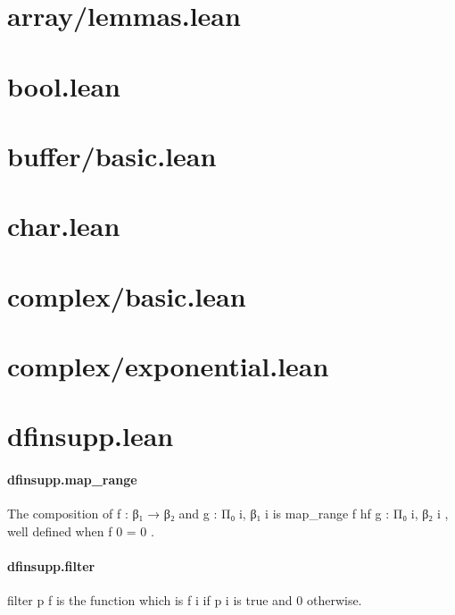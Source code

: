 \documentclass{article}
\begin{document}
\section{array/lemmas.lean}\section{bool.lean}\section{buffer/basic.lean}\section{char.lean}\section{complex/basic.lean}\section{complex/exponential.lean}\section{dfinsupp.lean}\paragraph{dfinsupp.map\_range}
\par
The composition of 
\colorbox[RGB]{253,246,227}{{{{\color[RGB]{101, 123, 131} f : β₁  }}}{{{\color[RGB]{133, 153, 0} → }}}{{{\color[RGB]{101, 123, 131}  β₂ }}}} and 
\colorbox[RGB]{253,246,227}{{{{\color[RGB]{101, 123, 131} g : Π₀ i, β₁ i }}}} is
\colorbox[RGB]{253,246,227}{{{{\color[RGB]{101, 123, 131} map\_range f hf g : Π₀ i, β₂ i }}}}, well defined when 
\colorbox[RGB]{253,246,227}{{{{\color[RGB]{101, 123, 131} f  }}}{{{\color[RGB]{108, 113, 196} 0 }}}{{{\color[RGB]{101, 123, 131}   }}}{{{\color[RGB]{181, 137, 0} = }}}{{{\color[RGB]{101, 123, 131}   }}}{{{\color[RGB]{108, 113, 196} 0 }}}}.
\paragraph{dfinsupp.filter}
\par
\colorbox[RGB]{253,246,227}{{{{\color[RGB]{101, 123, 131} filter p f }}}} is the function which is 
\colorbox[RGB]{253,246,227}{{{{\color[RGB]{101, 123, 131} f i }}}} if 
\colorbox[RGB]{253,246,227}{{{{\color[RGB]{101, 123, 131} p i }}}} is true and 0 otherwise.
\end{document}
